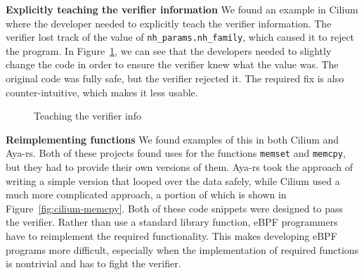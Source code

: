 
\noindent\textbf{Explicitly teaching the verifier information}
We found an example in Cilium where the developer needed to explicitly teach the verifier
    information.
The verifier lost track of the value of \texttt{nh\_params.nh\_family}, which caused it to reject the program.
In Figure~\ref{fig:teach-verifier}, we can see that the developers needed to slightly change the code in order to ensure the verifier knew what the value was.
The original code was fully safe, but the verifier rejected it.
The required fix is also counter-intuitive, which makes it less usable.

\begin{figure}
    
    \caption{Teaching the verifier info}
    \label{fig:teach-verifier}
\end{figure}

\noindent\textbf{Reimplementing functions}
We found examples of this in both Cilium and Aya-rs.
Both of these projects found uses for the functions \texttt{memset} and \texttt{memcpy}, but they had to provide their own versions of them.
Aya-rs took the approach of writing a simple version that looped over the data safely, while Cilium used a much more complicated approach, a portion of which is shown in Figure~\ref{fig:cilium-memcpy}.
Both of these code snippets were designed to pass the verifier.
Rather than use a standard library function, eBPF programmers have to reimplement the required functionality.
This makes developing eBPF programs more difficult, especially when the implementation of
    required functions is nontrivial and has to fight the verifier.

